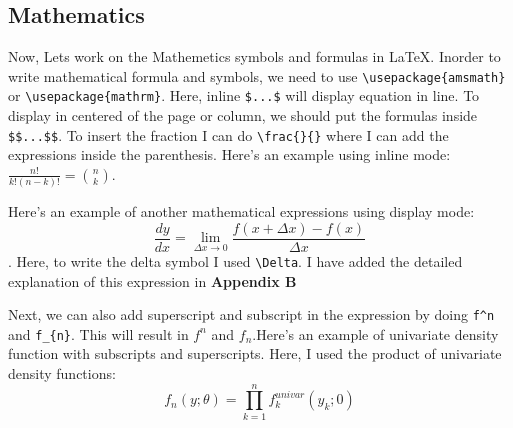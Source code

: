 \documentclass[12pt,journal,compsoc]{IEEEtran}
\begin{document}
\subsection{Mathematics}
Now, Lets work on the Mathemetics symbols and formulas in LaTeX. Inorder to write mathematical formula and symbols, we need to use \verb|\usepackage{amsmath}| or \verb|\usepackage{mathrm}|. Here, inline \verb|$...$| will display equation in line. To display in centered of the page or column, we should put the formulas inside \verb|$$...$$|. To insert the fraction I can do \verb|\frac{}{}| where I can add the expressions inside the parenthesis. Here's an example using inline mode:
$\frac{n!}{k!(n-k)!} = \binom{n}{k}$. 

Here's an example of another mathematical expressions using display mode:
$$\frac{dy}{dx} = \lim_{\Delta x \to 0} \frac{f(x + \Delta x)-f(x)}{\Delta x}$$. Here, to write the delta symbol I used \verb|\Delta|. I have added the detailed explanation of this expression in \textbf{Appendix B}

Next, we can also add superscript and subscript in the expression by doing \verb|f^n| and \verb|f_{n}|. This will result in $f^n$ and $f_{n}$.Here's an example of univariate density function with subscripts and superscripts. Here, I used the product of univariate density functions:
\[ f_{n}(y;\theta) = \prod^n_{k=1} f^{univar}_{k}(y_{k}; 0)\]
\end{document}
